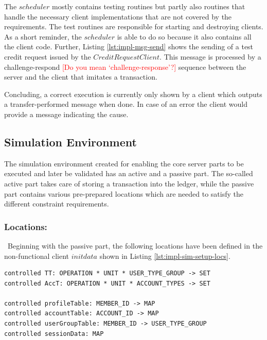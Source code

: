The $scheduler$ mostly contains testing routines but partly also routines that handle the necessary client implementations that are not covered by the requirements. The test routines are responsible for starting and destroying clients. As a short reminder, the $scheduler$ is able to do so because it also contains all the client code. Further, Listing \ref{lst:impl-msg-send} shows the sending of a test credit request issued by the $CreditRequestClient$. This message is processed by a challenge-respond 
\textcolor{red}{[Do you mean `challenge-response'?]} sequence between the server and the client that imitates a transaction.

Concluding, a correct execution is currently only shown by a client which outputs a transfer-performed message when done. In case of an error the client would provide a message indicating the cause.

\subsection{Simulation Environment}
\label{subsec:impl-sim-env}

The simulation environment created for enabling the core server parts to be executed and later be validated has an active and a passive part. The so-called active part takes care of storing a transaction into the ledger, while the passive part contains various pre-prepared locations which are needed to satisfy the different constraint requirements.

\subsubsection{Locations: }\ Beginning with the passive part, the following locations have been defined in the non-functional client $initdata$ shown in Listing \ref{lst:impl-sim-setup-locs}.

\begin{center}
\begin{minipage}{0.8\textwidth}
\small
\begin{lstlisting}[language=bsl_lst,caption={\bf\small Simulation environment locations},label={lst:impl-sim-setup-locs} ]
controlled TT: OPERATION * UNIT * USER_TYPE_GROUP -> SET
controlled AccT: OPERATION * UNIT * ACCOUNT_TYPES -> SET

controlled profileTable: MEMBER_ID -> MAP
controlled accountTable: ACCOUNT_ID -> MAP
controlled userGroupTable: MEMBER_ID -> USER_TYPE_GROUP
controlled sessionData: MAP
\end{lstlisting}
\end{minipage}
\end{center}

